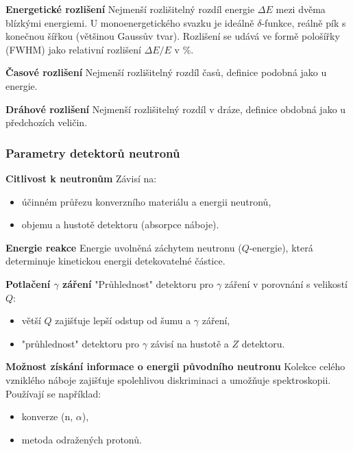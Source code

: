 \textbf{Energetické rozlišení} \textendash{} Nejmenší rozlišitelný rozdíl energie $\Delta E$ mezi dvěma blízkými energiemi. U monoenergetického svazku je ideálně $\delta$-funkce, reálně pík s konečnou šířkou (většinou Gaussův tvar). Rozlišení se udává ve formě pološířky (FWHM) jako relativní rozlišení $\Delta E / E$ v \%.

\textbf{Časové rozlišení} \textendash{} Nejmenší rozlišitelný rozdíl časů, definice podobná jako u energie.

\textbf{Dráhové rozlišení} \textendash{} Nejmenší rozlišitelný rozdíl v dráze, definice obdobná jako u předchozích veličin.

\subsubsection{Parametry detektorů neutronů}

\textbf{Citlivost k neutronům} \textendash{} Závisí na:
\begin{itemize}
    \item účinném průřezu konverzního materiálu a energii neutronů,
    \item objemu a hustotě detektoru (absorpce náboje).
\end{itemize}

\textbf{Energie reakce} \textendash{} Energie uvolněná záchytem neutronu ($Q$-energie), která determinuje kinetickou energii detekovatelné částice.

\textbf{Potlačení $\gamma$ záření} \textendash{} "Průhlednost" detektoru pro $\gamma$ záření v porovnání s velikostí $Q$:
\begin{itemize}
    \item větší $Q$ zajišťuje lepší odstup od šumu a $\gamma$ záření,
    \item "průhlednost" detektoru pro $\gamma$ závisí na hustotě a $Z$ detektoru.
\end{itemize}

\textbf{Možnost získání informace o energii původního neutronu} \textendash{} Kolekce celého vzniklého náboje zajišťuje spolehlivou diskriminaci a umožňuje spektroskopii. Používají se například:
\begin{itemize}
    \item konverze (n, $\alpha$),
    \item metoda odražených protonů.
\end{itemize}

